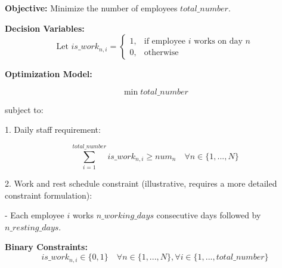 \documentclass{article}
\begin{document}
\textbf{Objective:} Minimize the number of employees \( total\_number \).

\textbf{Decision Variables:}
\[
\text{Let } is\_work_{n,i} =
\begin{cases} 
1, & \text{if employee } i \text{ works on day } n \\
0, & \text{otherwise}
\end{cases}
\]

\textbf{Optimization Model:}

\[
\min total\_number
\]

subject to:

1. Daily staff requirement:

\[
\sum_{i=1}^{total\_number} is\_work_{n,i} \geq num_n \quad \forall n \in \{1,...,N\}
\]

2. Work and rest schedule constraint (illustrative, requires a more detailed constraint formulation):

- Each employee \( i \) works \( n\_working\_days \) consecutive days followed by \( n\_resting\_days \).

\textbf{Binary Constraints:}
\[
is\_work_{n,i} \in \{0,1\} \quad \forall n \in \{1,...,N\}, \forall i \in \{1,...,total\_number\}
\]
\end{document}
